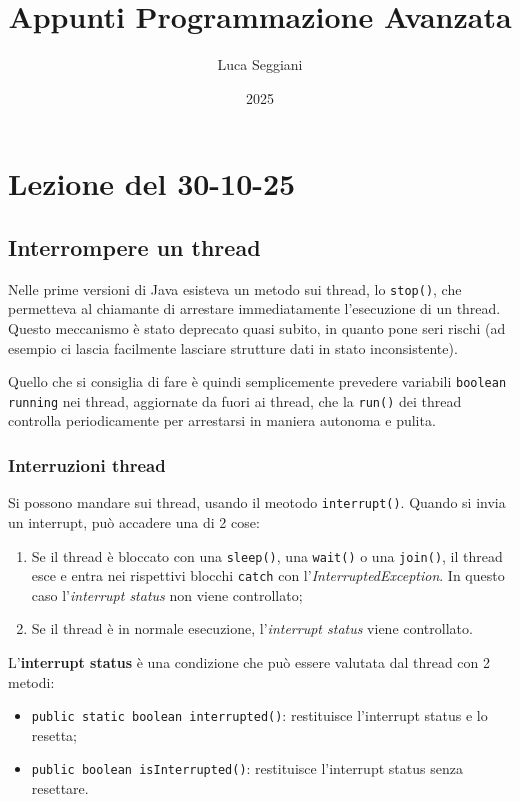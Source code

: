 \documentclass[a4paper,11pt]{article}
\title{Appunti Programmazione Avanzata}
\author{Luca Seggiani}
\date{2025}
\begin{document}
\section{Lezione del 30-10-25}

\thispagestyle{empty}
\pagestyle{fancy}

\subsection{Interrompere un thread}
Nelle prime versioni di Java esisteva un metodo sui thread, lo \lstinline|stop()|, che permetteva al chiamante di arrestare immediatamente l'esecuzione di un thread.
Questo meccanismo è stato deprecato quasi subito, in quanto pone seri rischi (ad esempio ci lascia facilmente lasciare strutture dati in stato inconsistente).

Quello che si consiglia di fare è quindi semplicemente prevedere variabili \lstinline|boolean running| nei thread, aggiornate da fuori ai thread, che la \lstinline|run()| dei thread controlla periodicamente per arrestarsi in maniera autonoma e pulita.

\subsubsection{Interruzioni thread}
Si possono mandare  sui thread, usando il meotodo \lstinline|interrupt()|.
Quando si invia un interrupt, può accadere una di 2 cose:
\begin{enumerate}
	\item Se il thread è bloccato con una \lstinline|sleep()|, una \lstinline|wait()| o una \lstinline|join()|, il thread esce e entra nei rispettivi blocchi \lstinline|catch| con l'\textit{InterruptedException}. In questo caso l'\textit{interrupt status} non viene controllato;
	\item Se il thread è in normale esecuzione, l'\textit{interrupt status} viene controllato.
\end{enumerate}

L'\textbf{interrupt status} è una condizione che può essere valutata dal thread con 2 metodi:
\begin{itemize}
	\item \lstinline|public static boolean interrupted()|: restituisce l'interrupt status e lo resetta;
	\item \lstinline|public boolean isInterrupted()|: restituisce l'interrupt status senza resettare.
\end{itemize}
\end{document}
